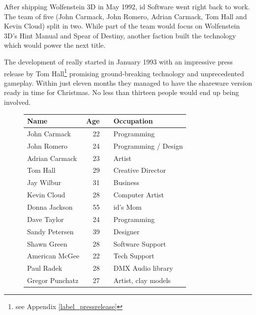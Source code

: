 \vspace{-5pt}
After shipping Wolfenstein 3D in May 1992, id Software went right back to work. The team of five (John Carmack, John Romero, Adrian Carmack, Tom Hall and Kevin Cloud) split in two. While part of the team would focus on Wolfenstein 3D's Hint Manual and Spear of Destiny, another faction built the technology which would power the next title.\\
\par
The development of \doom{} really started in January 1993 with an impressive press release by Tom Hall\protect\footnote{see Appendix \ref{label_pressrelease}} promising ground-breaking technology and unprecedented gameplay. Within just eleven months they managed to have the shareware version ready in time for Christmas. No less than thirteen people would end up being involved.\\
\par
 \begin{figure}[H]
\centering  
\begin{tabularx}{\textwidth}{L{0.3} R{0.2} L{0.1} L{0.4}  }
  \toprule
  \textbf{Name} &  \textbf{Age} & &\textbf{Occupation} \\
  \toprule 
   John Carmack & 22 &  &Programming\\
   John Romero & 24 &  &Programming / Design\\
   Adrian Carmack\protect\footnotemark & 23 &  &Artist\\
   Tom Hall\protect\footnotemark  & 29 &  &Creative Director\\
   Jay Wilbur & 31 &  &Business\\
   Kevin Cloud& 28 &  &Computer Artist\\
   Donna Jackson & 55 & &id's Mom\\   
   Dave Taylor & 24 & &Programming\\
   Sandy Petersen & 39 & &Designer\\
   Shawn Green & 28 & &Software Support\\
   American McGee & 22 & &Tech Support\\
   Paul Radek & 28 & &DMX Audio library\\
   Gregor Punchatz & 27 & &Artist, clay models\\

     \toprule
\end{tabularx}
\label{fig:Id Software team}
\end{figure}



